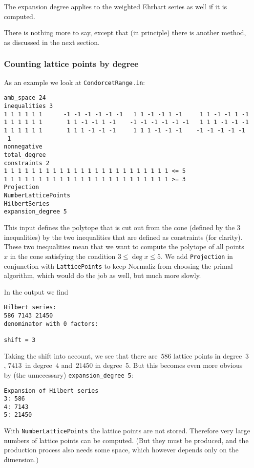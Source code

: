 \documentclass[12pt,a4paper]{scrartcl}
\theoremstyle{definition}
\begin{document}
The expansion degree applies to the weighted Ehrhart series as well if it is computed.

There is nothing more to say, except that (in principle) there is another method, as discussed in the next section.

\subsubsection{Counting lattice points by degree}\label{count}

As an example we look at \verb|CondorcetRange.in|:
\begin{Verbatim}
amb_space 24
inequalities 3
1 1 1 1 1 1      -1 -1 -1 -1 -1 -1   1 1 -1 -1 1 -1     1 1 -1 -1 1 -1
1 1 1 1 1 1       1 1 -1 -1 1 -1    -1 -1 -1 -1 -1 -1   1 1 1 -1 -1 -1
1 1 1 1 1 1       1 1 1 -1 -1 -1     1 1 1 -1 -1 -1    -1 -1 -1 -1 -1 -1
nonnegative
total_degree
constraints 2
1 1 1 1 1 1 1 1 1 1 1 1 1 1 1 1 1 1 1 1 1 1 1 1 <= 5
1 1 1 1 1 1 1 1 1 1 1 1 1 1 1 1 1 1 1 1 1 1 1 1 >= 3
Projection
NumberLatticePoints
HilbertSeries
expansion_degree 5
\end{Verbatim}
This input defines the polytope that is cut out from the cone (defined by the $3$ inequalities) by the two inequalities that are defined as constraints (for clarity). These two inequalities mean that we want to compute the polytope of all points $x$ in the cone satisfying the condition $3\le \deg x \le 5$. We add \verb|Projection| in conjunction with \verb|LatticePoints| to keep Normaliz from choosing the primal algorithm, which would do the job as well, but much more slowly.

In the output we find
\begin{Verbatim}
Hilbert series:
586 7143 21450 
denominator with 0 factors:

shift = 3
\end{Verbatim}

Taking the shift into account, we see that there are~$586$ lattice points in degree~$3$, $7413$~in degree~$4$ and~$21450$ in degree~$5$. But this becomes even more obvious by (the unnecessary) \verb|expansion_degree 5|:
\begin{Verbatim}
Expansion of Hilbert series
3: 586
4: 7143
5: 21450
\end{Verbatim}
With \verb|NumberLatticePoints| the lattice points are not stored. Therefore very large numbers of lattice points can be computed. (But they must be produced, and the production process also needs some space, which however depends only on the dimension.)
\end{document}
